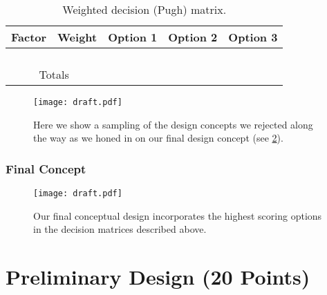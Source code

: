 \documentclass[report]{byu-aero}
\begin{document}
\begin{table}[h!]
	\centering
	\caption{Weighted decision (Pugh) matrix.}
	\label{tab:decisionmatrix1}
	\begin{tabular}{ |c|c|c|c|c| } 
		\hline
		\rowcolor{BYUbluemid}
    	Factor & Weight & Option 1 & Option 2 & Option 3 \\ 
		\hline
	     &  &  &  &  \\ 
		\hline
		 &  &  &  &  \\ 
		\hline
		 &  &  &  &  \\ 
		\hline
		 &  &  &  &  \\ 
		\hline
		\multicolumn{2}{|c|}{Totals} &  &  &  \\ %
		\hline
	\end{tabular}
\end{table}

\begin{figure}[h!]
	\centering
	\texttt{[image: draft.pdf]}
	\caption{Here we show a sampling of the design concepts we rejected along the way as we honed in on our final design concept (see \cref{fig:finalconcept}).}
	\label{fig:rejecteddesigns}
\end{figure}

\subsubsection{Final Concept}
\label{sssec:finalconcept}

\begin{figure}[h!]
	\centering
	\texttt{[image: draft.pdf]}
	\caption{Our final conceptual design incorporates the highest scoring options in the decision matrices described above.}
	\label{fig:finalconcept}
\end{figure}

\section{Preliminary Design (20 Points)}
\label{sec:PreliminaryDesign}
\end{document}
